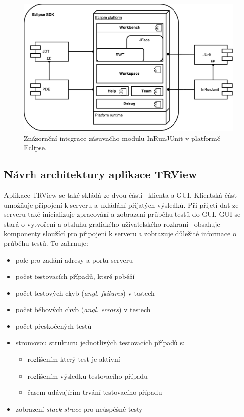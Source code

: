       \begin{figure}
	\includegraphics[width=\textwidth, center]{obrazky-figures/inrunjunit_eclipse_integration.pdf}
	\caption{Znázornění integrace zásuvného modulu InRunJUnit v platformě Eclipse.}
	\label{fig:inrunjunit_eclipse_integration}
      \end{figure}

    \subsection{Návrh architektury aplikace TRView}
    Aplikace TRView se také skládá ze dvou částí\,--\,klienta a GUI. Klientská část umožňuje připojení k serveru a ukládání přijatých výsledků. Při přijetí dat ze serveru také inicializuje zpracování a zobrazení průběhu testů do GUI. GUI se stará o vytvoření a obsluhu grafického uživatelského rozhraní\,--\,obsahuje komponenty sloužící pro připojení k serveru a zobrazuje důležité informace o průběhu testů. To zahrnuje:
    \begin{itemize}
     \item pole pro zadání adresy a portu serveru
     \item počet testovacích případů, které poběží
     \item počet testových chyb (\emph{angl. failures}) v testech
     \item počet běhových chyb (\emph{angl. errors}) v testech
     \item počet přeskočených testů
     \item stromovou strukturu jednotlivých testovacích případů s:
     \begin{itemize}
      \item rozlišením který test je aktivní
      \item rozlišením výsledku testovacího případu
      \item časem udávajícím trvání testovacího případu
     \end{itemize}
     \item zobrazení \emph{stack strace} pro neúspěšné testy
    \end{itemize}

